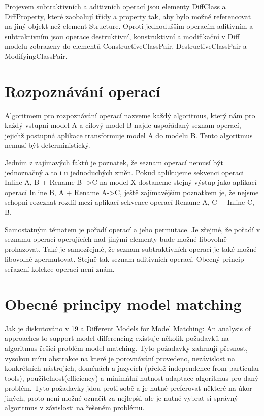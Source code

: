 \documentclass[11pt,twoside,a4paper]{book}
\begin{document}
 Projevem subtraktivních a aditivních operací jsou elementy DiffClass a
 DiffProperty, které zaobalují třídy a property tak, aby bylo možné referencovat
 na jiný objekt než element Structure. Oproti jednodušším operacím aditivním a
 subtraktivním jsou operace destruktivní, konstruktivní a modifikační v Diff
 modelu zobrazeny do elementů ConstructiveClassPair, DestructiveClassPair a
 ModifyingClassPair. 

\section{Rozpoznávání operací}

Algoritmem pro rozpoznávání operací nazveme každý algoritmus, který nám pro
každý vstupní model A a cílový model B najde uspořádaný seznam operací, jejichž
postupná aplikace transformuje model A do modelu B. Tento algoritmus nemusí být
deterministický.

Jedním z zajímavých faktů je poznatek, že seznam operací nemusí být jednoznačný
a to i u jednoduchých změn. Pokud aplikujeme sekvenci operaci Inline A, B + 
Rename B ->C na model X dostaneme stejný výstup jako aplikací operací Inline B,
A + Rename A->C, ještě zajímavějším poznatkem je, že nejsme schopni rozeznat
rozdíl mezi aplikací sekvence operací Rename A, C + Inline C, B.

Samostatným tématem je pořadí operací a jeho permutace. Je zřejmé, že pořadí v
seznamu operací operujících nad jinými elementy bude možné libovolně prohazovat.
Také je samozřejmé, že seznam subtraktivních operací je také možné libovolně
zpermutovat. Stejně tak seznam aditivních operací. Obecný princip seřazení kolekce 
operací není znám. 

\section{Obecné principy model matching}
Jak je diskutováno v 19 a Different Models for Model Matching:
An analysis of approaches to support model differencing existuje několik
požadavků na algoritmus řešící problém model matching. Tyto požadavky zahrnují
přesnost, vysokou míru abstrakce na které je porovnávání provedeno, nezávislost
na konkrétních nástrojích, doménách a jazycích (přelož independence from
particular tools), použitelnost(efficiency) a minimální nutnost adaptace
algoritmus pro daný problém. Tyto požadavky jdou proti sobě a je nutné
preferovat některé na úkor jiných, proto není možné označit za nejlepší, ale je
nutné vybrat si správný algoritmus v závislosti na řešeném problému.
\end{document}
